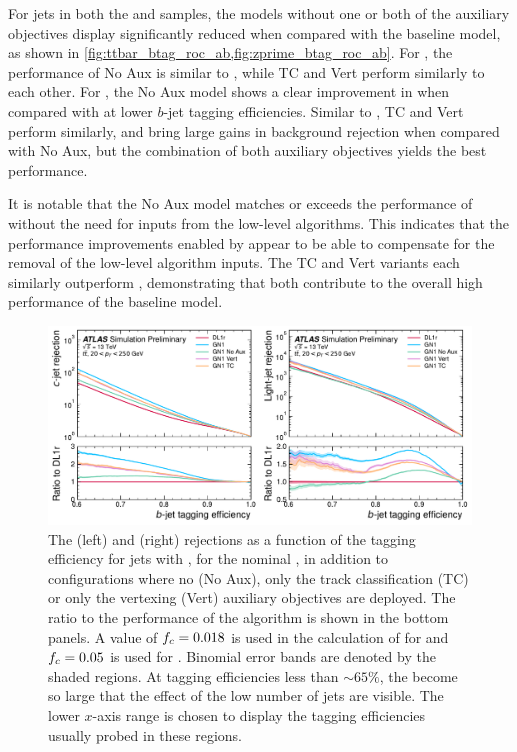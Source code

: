 For jets in both the \ttbar and \Zprime samples, the models without one or both of the auxiliary objectives display significantly reduced \clrej when compared with the baseline \GNN model, as shown in \cref{fig:ttbar_btag_roc_ab,fig:zprime_btag_roc_ab}.
For \ttbarjets, the performance of \GNN No Aux is similar to \DLr, while \GNN TC and \GNN Vert perform similarly to each other.
For \Zprimejets, the \GNN No Aux model shows a clear improvement in \clrej when compared with \DLr at lower $b$-jet tagging efficiencies.
Similar to \ttbarjets, \GNN TC and \GNN Vert perform similarly, and bring large gains in background rejection when compared with \GNN No Aux, but the combination of both auxiliary objectives yields the best performance.

It is notable that the \GNN No Aux model matches or exceeds the performance of \DLr without the need for inputs from the low-level algorithms.
This indicates that the performance improvements enabled by \GNN appear to be able to compensate for the removal of the low-level algorithm inputs.
The \GNN TC and \GNN Vert variants each similarly outperform \DLr, demonstrating that both contribute to the overall high performance of the baseline model.


\begin{figure}[!p]
    \centering
    \includegraphics[width=\textwidth]{chapters/gnn_tagger/figs/results/ablations/ttbar/ttbar_roc_btag.pdf}
    \caption{The \cjet (left) and \ljet (right) rejections as a function of the \bjet tagging efficiency for \ttbar jets with \ttbarpt, for the nominal \GNN, in addition to configurations where no (\GNN No Aux), only the track classification (\GNN TC) or only the vertexing (\GNN Vert) auxiliary objectives are deployed. The ratio to the performance of the \DLr algorithm is shown in the bottom panels. A value of $f_c = 0.018$ is used in the calculation of \Db for \DLr and $f_c = 0.05$ is used for \GNN. Binomial error bands are denoted by the shaded regions. At \bjet tagging efficiencies less than $\sim65\%$, the \lrej become so large that the effect of the low number of jets are visible. The lower $x$-axis range is chosen to display the \bjet tagging efficiencies usually probed in these regions.}
    \label{fig:ttbar_btag_roc_ab}
\end{figure}

